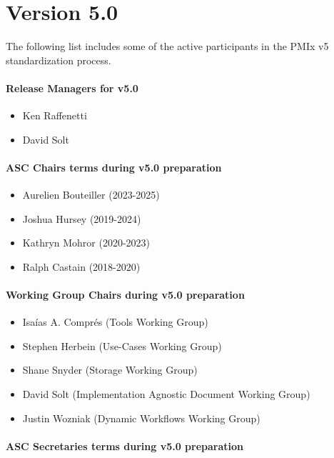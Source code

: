 \section{Version 5.0}

The following list includes some of the active participants in the PMIx v5 standardization process.

\paragraph*{Release Managers for v5.0}

\begin{itemize}
    \item Ken Raffenetti
    \item David Solt
\end{itemize}

\paragraph*{ASC Chairs terms during v5.0 preparation}

\begin{itemize}
    \item Aurelien Bouteiller (2023-2025)
    \item Joshua Hursey (2019-2024)
    \item Kathryn Mohror (2020-2023)
    \item Ralph Castain (2018-2020)
\end{itemize}

\paragraph*{Working Group Chairs during v5.0 preparation}

\begin{itemize}
    \item Isaías A. Comprés (Tools Working Group)
    \item Stephen Herbein (Use-Cases Working Group)
    \item Shane Snyder (Storage Working Group)
    \item David Solt (Implementation Agnostic Document Working Group)
    \item Justin Wozniak (Dynamic Workflows Working Group)
\end{itemize}

\paragraph*{ASC Secretaries terms during v5.0 preparation}

